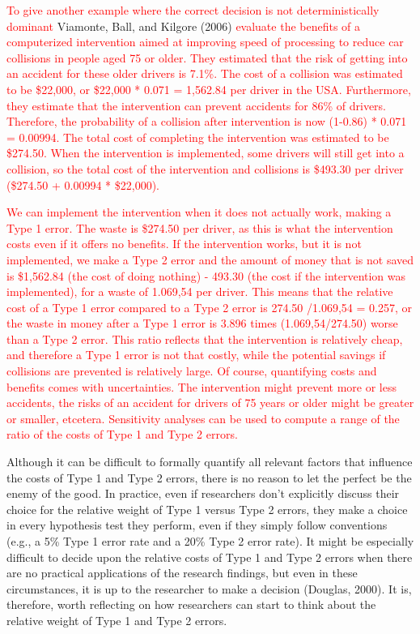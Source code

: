 \documentclass[
  english,
  ,man, a4paper,floatsintext]{apa6}
\begin{document}
\textcolor{red}{To give another example where the correct decision is not deterministically dominant} Viamonte, Ball, and Kilgore (2006)
\textcolor{red}{evaluate the benefits of a computerized intervention aimed at improving speed of processing to reduce car collisions in people aged 75 or older. They estimated that the risk of getting into an accident for these older drivers is 7.1\%. The cost of a collision was estimated to be \$22,000, or \$22,000 * 0.071 = 1,562.84 per driver in the USA. Furthermore, they estimate that the intervention can prevent accidents for 86\% of drivers. Therefore, the probability of a collision after intervention is now (1-0.86) * 0.071 = 0.00994. The total cost of completing the intervention was estimated to be \$274.50. When the intervention is implemented, some drivers will still get into a collision, so the total cost of the intervention and collisions is \$493.30 per driver (\$274.50 + 0.00994 * \$22,000).}

\textcolor{red}{We can implement the intervention when it does not actually work, making a Type 1 error. The waste is \$274.50 per driver, as this is what the intervention costs even if it offers no benefits. If the intervention works, but it is not implemented, we make a Type 2 error and the amount of money that is not saved is \$1,562.84 (the cost of doing nothing) - 493.30 (the cost if the intervention was implemented), for a waste of 1.069,54 per driver. This means that the relative cost of a Type 1 error compared to a Type 2 error is 274.50 /1.069,54 = 0.257, or the waste in money after a Type 1 error is 3.896 times (1.069,54/274.50) worse than a Type 2 error. This ratio reflects that the intervention is relatively cheap, and therefore a Type 1 error is not that costly, while the potential savings if collisions are prevented is relatively large. Of course, quantifying costs and benefits comes with uncertainties. The intervention might prevent more or less accidents, the risks of an accident for drivers of 75 years or older might be greater or smaller, etcetera. Sensitivity analyses can be used to compute a range of the ratio of the costs of Type 1 and Type 2 errors. 
}

Although it can be difficult to formally quantify all relevant factors that influence the costs of Type 1 and Type 2 errors, there is no reason to let the perfect be the enemy of the good. In practice, even if researchers don't explicitly discuss their choice for the relative weight of Type 1 versus Type 2 errors, they make a choice in every hypothesis test they perform, even if they simply follow conventions (e.g., a 5\% Type 1 error rate and a 20\% Type 2 error rate). It might be especially difficult to decide upon the relative costs of Type 1 and Type 2 errors when there are no practical applications of the research findings, but even in these circumstances, it is up to the researcher to make a decision (Douglas, 2000). It is, therefore, worth reflecting on how researchers can start to think about the relative weight of Type 1 and Type 2 errors.
\end{document}
